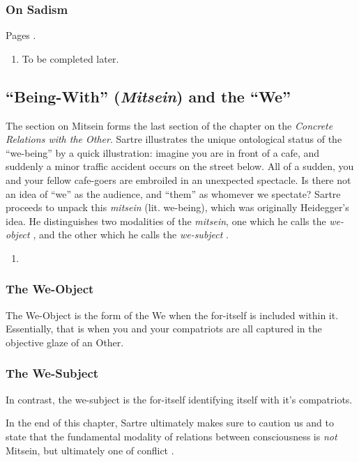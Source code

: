 \subsubsection{On Sadism}

Pages \autocite[526 --]{sartre}.

\begin{enumerate}
  \item To be completed later.
\end{enumerate}

\subsection{\enquote{Being-With} (\emph{Mitsein}) and the \enquote{We}}

The section on Mitsein \autocite[543 -- 566]{sartre} forms the last section of the chapter on the \emph{Concrete Relations with the Other}. Sartre illustrates the unique ontological status of the \enquote{we-being} by a quick illustration: imagine you are in front of a cafe, and suddenly a minor traffic accident occurs on the street below. All of a sudden, you and your fellow cafe-goers are embroiled in an unexpected spectacle. Is there not an idea of \enquote{we} as the audience, and \enquote{them} as whomever we spectate? Sartre proceeds to unpack this \emph{mitsein} (lit. we-being), which was originally Heidegger's idea. He distinguishes two modalities of the \emph{mitsein}, one which he calls the \emph{we-object} \autocite[546 -- 557]{sartre}, and the other which he calls the \emph{we-subject} \autocite[557 -- 566]{sartre}.

\begin{enumerate}
  \item {}
\end{enumerate}

\subsubsection{The We-Object}
The We-Object is the form of the We when the for-itself is included within it. Essentially, that is when you and your compatriots are all captured in the objective glaze of an Other.

\subsubsection{The We-Subject}
In contrast, the we-subject is the for-itself identifying itself with it's compatriots. 

\noindent
In the end of this chapter, Sartre ultimately makes sure to caution us and to state that the fundamental modality of relations between consciousness is \emph{not} Mitsein, but ultimately one of conflict \autocite[564]{sartre}.
